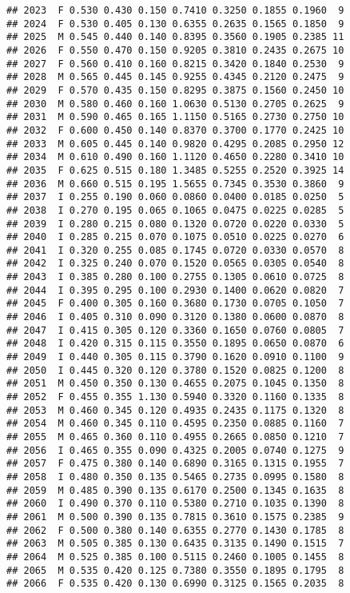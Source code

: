 \documentclass[
]{article}
\begin{document}
\begin{verbatim}
## 2023  F 0.530 0.430 0.150 0.7410 0.3250 0.1855 0.1960  9
## 2024  F 0.530 0.405 0.130 0.6355 0.2635 0.1565 0.1850  9
## 2025  M 0.545 0.440 0.140 0.8395 0.3560 0.1905 0.2385 11
## 2026  F 0.550 0.470 0.150 0.9205 0.3810 0.2435 0.2675 10
## 2027  F 0.560 0.410 0.160 0.8215 0.3420 0.1840 0.2530  9
## 2028  M 0.565 0.445 0.145 0.9255 0.4345 0.2120 0.2475  9
## 2029  F 0.570 0.435 0.150 0.8295 0.3875 0.1560 0.2450 10
## 2030  M 0.580 0.460 0.160 1.0630 0.5130 0.2705 0.2625  9
## 2031  M 0.590 0.465 0.165 1.1150 0.5165 0.2730 0.2750 10
## 2032  F 0.600 0.450 0.140 0.8370 0.3700 0.1770 0.2425 10
## 2033  M 0.605 0.445 0.140 0.9820 0.4295 0.2085 0.2950 12
## 2034  M 0.610 0.490 0.160 1.1120 0.4650 0.2280 0.3410 10
## 2035  F 0.625 0.515 0.180 1.3485 0.5255 0.2520 0.3925 14
## 2036  M 0.660 0.515 0.195 1.5655 0.7345 0.3530 0.3860  9
## 2037  I 0.255 0.190 0.060 0.0860 0.0400 0.0185 0.0250  5
## 2038  I 0.270 0.195 0.065 0.1065 0.0475 0.0225 0.0285  5
## 2039  I 0.280 0.215 0.080 0.1320 0.0720 0.0220 0.0330  5
## 2040  I 0.285 0.215 0.070 0.1075 0.0510 0.0225 0.0270  6
## 2041  I 0.320 0.255 0.085 0.1745 0.0720 0.0330 0.0570  8
## 2042  I 0.325 0.240 0.070 0.1520 0.0565 0.0305 0.0540  8
## 2043  I 0.385 0.280 0.100 0.2755 0.1305 0.0610 0.0725  8
## 2044  I 0.395 0.295 0.100 0.2930 0.1400 0.0620 0.0820  7
## 2045  F 0.400 0.305 0.160 0.3680 0.1730 0.0705 0.1050  7
## 2046  I 0.405 0.310 0.090 0.3120 0.1380 0.0600 0.0870  8
## 2047  I 0.415 0.305 0.120 0.3360 0.1650 0.0760 0.0805  7
## 2048  I 0.420 0.315 0.115 0.3550 0.1895 0.0650 0.0870  6
## 2049  I 0.440 0.305 0.115 0.3790 0.1620 0.0910 0.1100  9
## 2050  I 0.445 0.320 0.120 0.3780 0.1520 0.0825 0.1200  8
## 2051  M 0.450 0.350 0.130 0.4655 0.2075 0.1045 0.1350  8
## 2052  F 0.455 0.355 1.130 0.5940 0.3320 0.1160 0.1335  8
## 2053  M 0.460 0.345 0.120 0.4935 0.2435 0.1175 0.1320  8
## 2054  M 0.460 0.345 0.110 0.4595 0.2350 0.0885 0.1160  7
## 2055  M 0.465 0.360 0.110 0.4955 0.2665 0.0850 0.1210  7
## 2056  I 0.465 0.355 0.090 0.4325 0.2005 0.0740 0.1275  9
## 2057  F 0.475 0.380 0.140 0.6890 0.3165 0.1315 0.1955  7
## 2058  I 0.480 0.350 0.135 0.5465 0.2735 0.0995 0.1580  8
## 2059  M 0.485 0.390 0.135 0.6170 0.2500 0.1345 0.1635  8
## 2060  I 0.490 0.370 0.110 0.5380 0.2710 0.1035 0.1390  8
## 2061  M 0.500 0.390 0.135 0.7815 0.3610 0.1575 0.2385  9
## 2062  F 0.500 0.380 0.140 0.6355 0.2770 0.1430 0.1785  8
## 2063  M 0.505 0.385 0.130 0.6435 0.3135 0.1490 0.1515  7
## 2064  M 0.525 0.385 0.100 0.5115 0.2460 0.1005 0.1455  8
## 2065  M 0.535 0.420 0.125 0.7380 0.3550 0.1895 0.1795  8
## 2066  F 0.535 0.420 0.130 0.6990 0.3125 0.1565 0.2035  8

\end{verbatim}
\end{document}
